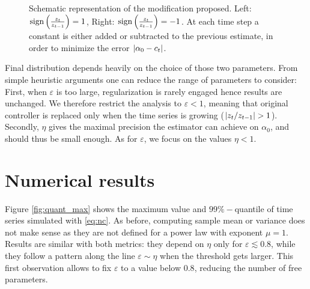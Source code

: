 \documentclass[FinalReport.tex]{subfiles}
\begin{document}
\begin{figure}
\centering
{}
\caption{Schematic representation of the modification proposed. Left: $\text{sign}\left(\frac{z_t}{z_{t-1}}\right)=1$, Right: $\text{sign}\left(\frac{z_t}{z_{t-1}}\right)=-1$. At each time step a constant is either added or subtracted to the previous estimate, in order to minimize the error $\abs{\alpha_0-c_t}$.}
\label{fig:new_cont_scheme}
\end{figure}
Final distribution depends heavily on the choice of those two parameters. From simple heuristic arguments one can reduce the range of parameters to consider: First, when $\varepsilon$ is too large, regularization is rarely engaged hence results are unchanged. We therefore restrict the analysis to $\varepsilon<1$, meaning that original controller is replaced only when the time series is growing ($\abs{z_t/z_{t-1}}>1$). Secondly, $\eta$ gives the maximal precision the estimator can achieve on $\alpha_0$, and should thus be small enough. As for $\varepsilon$, we focus on the values $\eta<1$.



\section{Numerical results}
Figure \ref{fig:quant_max} shows the maximum value and $99\%-$quantile of time series simulated with \eqref{eq:nc}. As before, computing sample mean or variance does not make sense as they are not defined for a power law with exponent $\mu=1$. 
Results are similar with both metrics: they depend on $\eta$ only for $\varepsilon\lesssim 0.8$, while they follow a pattern along the line $\varepsilon\sim\eta$ when the threshold gets larger. This first observation allows to fix $\varepsilon$ to a value below $0.8$, reducing the number of free parameters.
\end{document}

